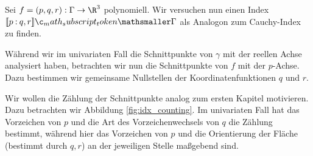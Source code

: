 \documentclass{mythesis}
\begin{document}
%

Sei $f = (p, q, r) : \Gamma \to \R^3$ polynomiell.
Wir versuchen nun einen Index $\Index{\Gamma}{p}{q,r}$ als Analogon zum Cauchy-Index zu finden.

Während wir im univariaten Fall die Schnittpunkte von $\gamma$ mit der reellen Achse analysiert haben, betrachten wir nun die Schnittpunkte von $f$ mit der $p$-Achse.
Dazu bestimmen wir gemeinsame Nullstellen der Koordinatenfunktionen $q$ und $r$.

Wir wollen die Zählung der Schnittpunkte analog zum ersten Kapitel motivieren.
Dazu betrachten wir Abbildung \ref{fig:idx_counting}.
Im univariaten Fall hat das Vorzeichen von $p$ und die Art des Vorzeichenwechsels von $q$ die Zählung bestimmt, während hier das Vorzeichen von $p$ und die Orientierung der Fläche (bestimmt durch $q, r$) an der jeweiligen Stelle maßgebend sind.

%
\end{document}
